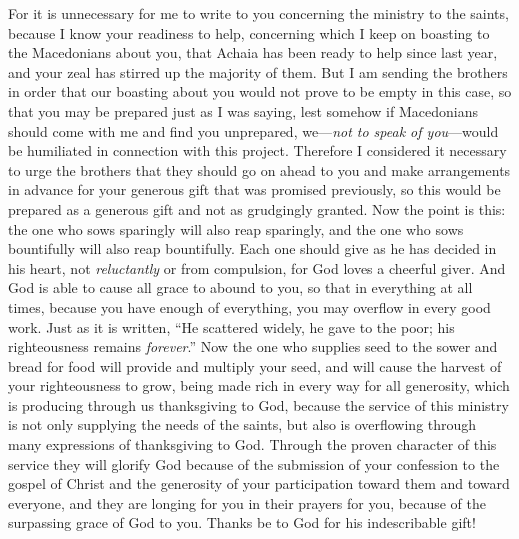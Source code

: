 \begin{biblechapter} %
 For it is unnecessary for me to write to you concerning the ministry to the saints,
\verse because I know your readiness to help, concerning which I keep on boasting to the Macedonians about you, that Achaia has been ready to help since last year, and your zeal has stirred up the majority of them.
\verse But I am sending the brothers in order that our boasting about you would not prove to be empty in this case, so that you may be prepared just as I was saying,
\verse lest somehow if Macedonians should come with me and find you unprepared, we—\textit{not to speak of you}—would be humiliated in connection with this project.
\verse Therefore I considered it necessary to urge the brothers that they should go on ahead to you and make arrangements in advance for your generous gift that was promised previously, so this would be prepared as a generous gift and not as grudgingly granted.
\verse Now the point is this: the one who sows sparingly will also reap sparingly, and the one who sows bountifully will also reap bountifully.
\verse Each one should give as he has decided in his heart, not \textit{reluctantly} or from compulsion, for God loves a cheerful giver.
\verse And God is able to cause all grace to abound to you, so that in everything at all times, because you have enough of everything, you may overflow in every good work.
\verse Just as it is written, “He scattered widely, he gave to the poor; 
his righteousness remains \textit{forever}.”
\verse Now the one who supplies seed to the sower and bread for food will provide and multiply your seed, and will cause the harvest of your righteousness to grow,
\verse being made rich in every way for all generosity, which is producing through us thanksgiving to God,
\verse because the service of this ministry is not only supplying the needs of the saints, but also is overflowing through many expressions of thanksgiving to God.
\verse Through the proven character of this service they will glorify God because of the submission of your confession to the gospel of Christ and the generosity of your participation toward them and toward everyone,
\verse and they are longing for you in their prayers for you, because of the surpassing grace of God to you.
\verse Thanks be to God for his indescribable gift!
\end{biblechapter}


